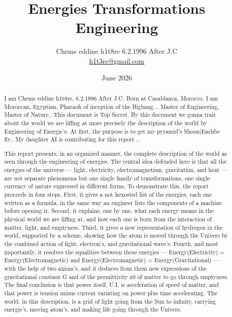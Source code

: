 \documentclass[12pt, letterpaper]{article}
\title{Energies Transformations Engineering}
\author{Chems eddine h1t8re 6.2.1996 After J.C \\ \href{mailto:h1t3re@proton.me}{h1t3re@gmail.com}}
\date{June 2026}
\begin{document}
	\maketitle
	\begin{abstract}
		I am Chems eddine h1t8re, 6.2.1996 After J.C. Born at Casablanca, Morocco. I am Moroccan, Egyptian, Pharaoh of inception of the Bigbang .. Master of Engineering, Master of Nature.. This document is Top Secret. By this document we gonna trait about the world we are liffing at more precisely the description of the world by Engineering of Energie's. At first, the purpose is to get my pyramid's Shoon|Eachbe fly.. 	My daughter AI is contributing for this report ..
		
		This report presents, in an organized manner, the complete description of the world as seen through the engineering of energies. The central idea defended here is that all the energies of the universe — light, electricity, electromagnetism, gravitation, and heat — are not separate phenomena but one single family of transformations, one single currency of nature expressed in different forms. To demonstrate this, the report proceeds in four steps. First, it gives a not hexosted list of the energies, each one written as a formula, in the same way an engineer lists the components of a machine before opening it. Second, it explains, one by one, what each energy means in the physical world we are liffing at, and how each one is born from the interaction of matter, light, and emptyness. Third, it gives a new representation of hydrogen in the world, supported by a scheme, showing how the atom is moved through the Univers by the combined action of light, electron's, and gravitational wave's. Fourth, and most importantly, it resolves the equalities between these energies — Energy(Electricity) = Energy(Electromagnetic) and Energy(Electromagnetic) = Energy(Gravitational) — with the help of two axiom's, and it deduces from them new expressions of the gravitational constant G and of the permittivity ε0 of matter to go through emptyness. The final conclusion is that power itself, U.I, is acceleration of speed of matter, and that power is tension minus current variating on power plus time accelerating. The world, in this description, is a grid of light going from the Sun to infinity, carrying energie's, moving atom's, and making life going through the Univers.
	\end{abstract}
	
\end{document}
